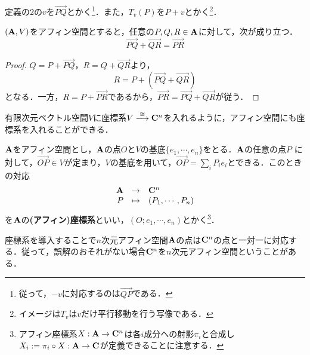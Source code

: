 \documentclass{myclass}
\begin{document}
\begin{definition}
  定義の2の$v$を$\overrightarrow{PQ}$とかく\footnote{従って，$-v$に対応するのは$\overrightarrow{QP}$である．}．また，$T_v(P)$を$P+v$とかく\footnote{イメージは$T_v$は$v$だけ平行移動を行う写像である．}．
\end{definition}

\begin{proposition}
  $(\mathbf{A},V)$をアフィン空間とすると，任意の$P,Q,R\in \mathbf{A}$に対して，次が成り立つ．
  \begin{equation*}
    \overrightarrow{PQ} + \overrightarrow{QR} = \overrightarrow{PR}
  \end{equation*}
\end{proposition}
\begin{proof}
  $Q = P + \overrightarrow{PQ}$，$R = Q + \overrightarrow{QR}$より，
  \begin{equation*}
    R = P + (\overrightarrow{PQ} + \overrightarrow{QR})
  \end{equation*}
  となる．一方，$R = P + \overrightarrow{PR}$であるから，$\overrightarrow{PR} = \overrightarrow{PQ} + \overrightarrow{QR}$が従う．
\end{proof}

有限次元ベクトル空間$V$に座標系$V \stackrel{\cong}{\longrightarrow} \mathbf{C}^n$を入れるように，アフィン空間にも座標系を入れることができる．

\begin{definition}
  $\mathbf{A}$をアフィン空間とし，$\mathbf{A}$の点$O$と$V$の基底$\{e_1,\cdots,e_n\}$をとる．$\mathbf{A}$の任意の点$P$
  に対して，$\overrightarrow{OP}\in V$が定まり，$V$の基底を用いて，$\overrightarrow{OP} = \sum_i P_ie_i$とできる．このときの対応
  \begin{equation*}
    \begin{array}{rcl}
      \mathbf{A} & \to & \mathbf{C}^n \\
      P & \mapsto & (P_1,\cdots,P_n)
    \end{array}
  \end{equation*}
  を$\mathbf{A}$の\textbf{(アフィン)座標系}といい，$(O;e_1,\cdots,e_n)$とかく\footnote{アフィン座標系$X:\mathbf{A} \to \mathbf{C}^n$は各$i$成分への射影$\pi_i$と合成し$X_i:=\pi_i \circ X:\mathbf{A}\to \mathbf{C}$が定義できることに注意する．}．
\end{definition}

\begin{remark}
  座標系を導入することで$n$次元アフィン空間$\mathbf{A}$の点は$\mathbf{C}^n$の点と一対一に対応する．従って，誤解のおそれがない場合$\mathbf{C}^n$を$n$次元アフィン空間ということがある．
\end{remark}
\end{document}
